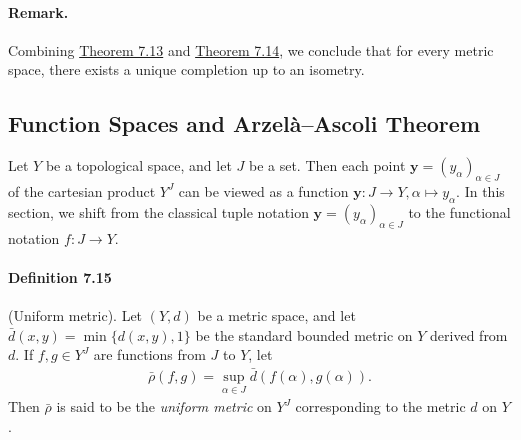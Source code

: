 \documentclass{article}
\numberwithin{equation}{section}
\theoremstyle{plain}
\theoremstyle{definition}
\begin{document}
\paragraph{Remark.} Combining \hyperref[thm:7.13]{Theorem 7.13} and \hyperref[thm:7.14]{Theorem 7.14}, we conclude that for every metric space, there exists a unique completion up to an isometry.

\subsection{Function Spaces and Arzelà–Ascoli Theorem}
Let $Y$ be a topological space, and let $J$ be a set. Then each point $\mathbf{y}=(y_\alpha)_{\alpha\in J}$ of the cartesian product $Y^J$ can be viewed as a function $\mathbf{y}:J\to Y,\alpha\mapsto y_\alpha$. In this section, we shift from the classical tuple notation $\mathbf{y}=(y_\alpha)_{\alpha\in J}$ to the functional notation $f:J\to Y$.

\paragraph{Definition 7.15\label{def:7.15}} (Uniform metric). Let $(Y,d)$ be a metric space, and let $\bar{d}(x,y)=\min\{d(x,y),1\}$ be the standard bounded metric on $Y$ derived from $d$. If $f,g\in Y^J$ are functions from $J$ to $Y$, let
\begin{align*}
	\bar{\rho}(f,g)=\sup_{\alpha\in J}\bar{d}\left(f(\alpha),g(\alpha)\right).
\end{align*}
Then $\bar{\rho}$ is said to be the \textit{uniform metric} on $Y^J$ corresponding to the metric $d$ on $Y$.
\end{document}
